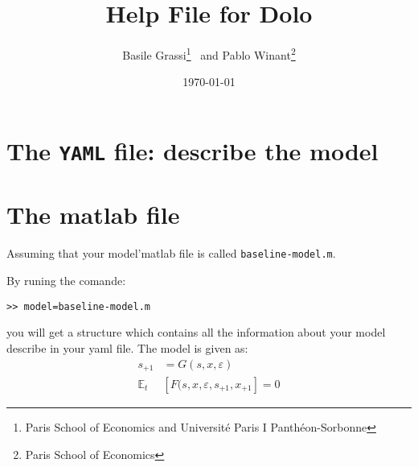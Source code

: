 \documentclass[12pt]{article}
\title{Help File for Dolo}
\author{Basile Grassi\footnote{Paris School of Economics and Universit\'e Paris I Panth\'eon-Sorbonne}~ and Pablo Winant\footnote{Paris School of Economics}}
\date{\today}
\newcommand{\E}[1]{\mathbb{E}_{#1}}
\begin{document}
\maketitle

\section{The \texttt{YAML} file: describe the model}

\section{The matlab file}
Assuming that your model'matlab file is called \texttt{baseline-model.m}.

By runing the comande:

\texttt{>> model=baseline-model.m}

you will get a structure which contains all the information about your model describe in your yaml file. The model is given as:
\begin{align*}
s_{+1} &= G(s,x,\varepsilon) \tag{Transition}\label{Transition}\\
\E{t}&[F(s,x,\varepsilon,s_{+1},x_{+1}]=0 \tag{Arbitrage}\label{Arbitrage}
\end{align*}
\end{document}
